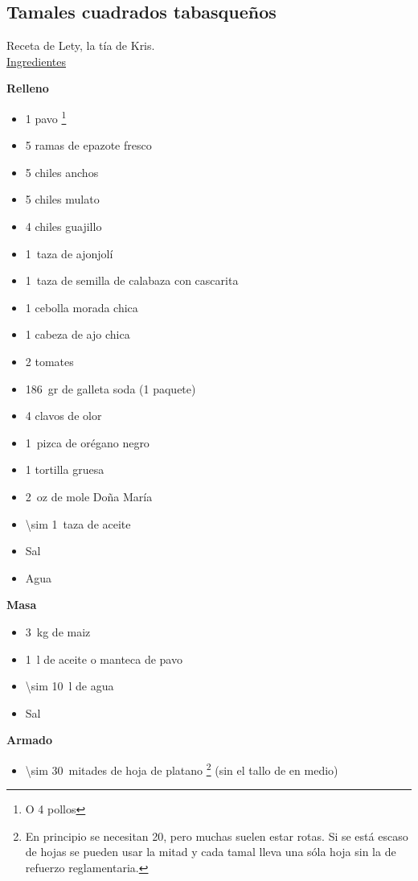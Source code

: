 \subsection{Tamales cuadrados tabasqueños}
\label{sec:tamales-cuadrados}

Receta de Lety, la tía de Kris.\\

\underline{Ingredientes}

\textbf{Relleno}
\begin{itemize}
\item 1 pavo \footnote{O 4 pollos}
\item 5 ramas de epazote fresco
\item 5 chiles anchos
\item 5 chiles mulato
\item 4 chiles guajillo
\item \SI{1}{taza} de ajonjolí
\item \SI{1}{taza} de semilla de calabaza con cascarita
\item 1 cebolla morada chica
\item 1 cabeza de ajo chica
\item 2 tomates
\item \SI{186}{gr} de galleta soda (1 paquete)
\item 4 clavos de olor
\item \SI{1}{pizca} de orégano negro
\item 1 tortilla gruesa
\item \SI{2}{oz} de mole Doña María
\item \SI{\sim 1}{taza} de aceite
\item Sal
\item Agua
\end{itemize}

\textbf{Masa}
\begin{itemize}
\item \SI{3}{kg} de maiz
\item \SI{1}{l} de aceite o manteca de pavo
\item \SI{\sim 10}{l} de agua
\item Sal
\end{itemize}

\textbf{Armado}
\begin{itemize}
\item \SI{\sim 30}{mitades} de hoja de platano \footnote{En principio se necesitan 20, pero muchas suelen estar rotas. Si se está escaso de hojas se pueden usar la mitad y cada tamal lleva una sóla hoja sin la de refuerzo reglamentaria.} (sin el tallo de en medio)
\end{itemize}

